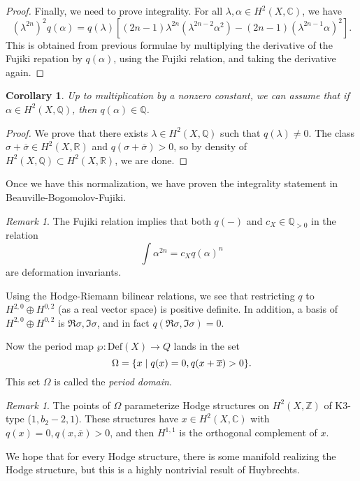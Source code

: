 \documentclass[leqno, openany]{memoir}
\newtheorem{cor}[thm]{Corollary}
\theoremstyle{definition}
\theoremstyle{remark}
\newtheorem{rmk}[thm]{Remark}
\theoremstyle{plain}
\theoremstyle{definition}
\theoremstyle{remark}
\newcommand{\R}{\mathbb{R}}
\newcommand{\C}{\mathbb{C}}
\newcommand{\Z}{\mathbb{Z}}
\newcommand{\Q}{\mathbb{Q}}
\newcommand{\mr}[1]{\mathrm{#1}}
\newcommand{\ol}[1]{\overline{#1}}
\begin{document}
\begin{proof}
    Finally, we need to prove integrality. For all $\lambda, \alpha \in H^2(X, \C)$, we have
    \[ {(\lambda^{2n})}^2 q(\alpha) = q(\lambda) [(2n-1) \lambda^{2n}(\lambda^{2n-2} \alpha^2) - (2n-1) {(\lambda^{2n-1} \alpha)}^2]. \]
    This is obtained from previous formulae by multiplying the derivative of the Fujiki repation by $q(\alpha)$, using the Fujiki relation, and taking the derivative again.
\end{proof}

\begin{cor}
    Up to multiplication by a nonzero constant, we can assume that if $\alpha \in H^2(X,\Q)$, then $q(\alpha) \in \Q$.
\end{cor}

\begin{proof}
    We prove that there exists $\lambda \in H^2(X, \Q)$ such that $q(\lambda) \neq 0$. The class $\sigma + \ol{\sigma} \in H^2(X, \R)$ and $q(\sigma + \ol{\sigma}) > 0$, so by density of $H^2(X, \Q) \subset H^2(X, \R)$, we are done.
\end{proof}

Once we have this normalization, we have proven the integrality statement in Beauville-Bogomolov-Fujiki.

\begin{rmk}
    The Fujiki relation implies that both $q(-)$ and $c_X \in \Q_{>0}$ in the relation
    \[ \int \alpha^{2n} = c_X {q(\alpha)}^n \]
    are deformation invariants.
\end{rmk}

Using the Hodge-Riemann bilinear relations, we see that restricting $q$ to $H^{2,0} \oplus H^{0,2}$ (as a real vector space) is positive definite. In addition, a basis of $H^{2,0} \oplus H^{0,2}$ is $\Re \sigma, \Im \sigma$, and in fact $q(\Re \sigma, \Im \sigma) = 0$.

Now the period map $\wp \colon \mr{Def}(X) \to Q$ lands in the set 
\[ \Omega = \qty{x \mid q(x) = 0, q(x+\ol{x}) > 0}. \]
This set $\Omega$ is called the \textit{period domain}.

\begin{rmk}
    The points of $\Omega$ parameterize Hodge structures on $H^2(X, \Z)$ of K3-type ($1, b_2-2, 1$). These structures have $x \in H^2(X, \C)$ with $q(x) = 0, q(x, \ol{x}) > 0$, and then $H^{1,1}$ is the orthogonal complement of $x$.
\end{rmk}

We hope that for every Hodge structure, there is some manifold realizing the Hodge structure, but this is a highly nontrivial result of Huybrechts.
\end{document}
